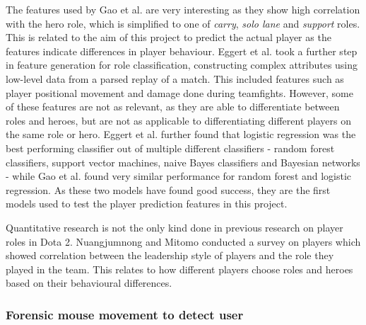 \documentclass[Report.tex]{subfiles}
\begin{document}
The features used by Gao et al. are very interesting as they show high correlation with the hero role, which is simplified to one of \textit{carry}, \textit{solo lane} and \textit{support} roles. This is related to the aim of this project to predict the actual player as the features indicate differences in player behaviour. Eggert et al. \cite{dota-eggert} took a further step in feature generation for role classification, constructing complex attributes using low-level data from a parsed replay of a match. This included features such as player positional movement and damage done during teamfights. However, some of these features are not as relevant, as they are able to differentiate between roles and heroes, but are not as applicable to differentiating different players on the same role or hero. Eggert et al. \cite{dota-eggert} further found that logistic regression was the best performing classifier out of multiple different classifiers - random forest classifiers, support vector machines, naive Bayes classifiers and Bayesian networks - while Gao et al. \cite{dota-gao} found very similar performance for random forest and logistic regression. As these two models have found good success, they are the first models used to test the player prediction features in this project. 

Quantitative research is not the only kind done in previous research on player roles in Dota 2. Nuangjumnong and Mitomo \cite{dota-leadership} conducted a survey on players which showed correlation between the leadership style of players and the role they played in the team. This relates to how different players choose roles and heroes based on their behavioural differences. 


\subsubsection{Forensic mouse movement to detect user}
\end{document}
